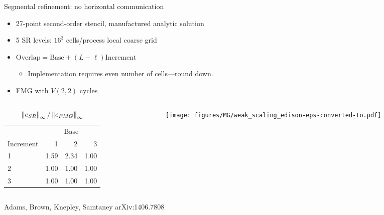 \documentclass{beamer}
\begin{document}

\begin{frame}{Segmental refinement: no horizontal communication}
  \begin{itemize}
  \item 27-point second-order stencil, manufactured analytic solution
  \item 5 SR levels: $16^3$ cells/process local coarse grid
  \item $\text{Overlap} = \text{Base} + (L-\ell) \text{Increment}$
    \begin{itemize}
    \item Implementation requires even number of cells---round down.
    \end{itemize}
  \item FMG with $V(2,2)$ cycles
  \end{itemize}
  \begin{columns}
    \begin{column}{0.4\textwidth}
      \begin{table}\small
        \centering\caption{$\left\lVert e_{SR} \right\rVert_\infty / \left\lVert e_{FMG} \right\rVert_\infty$}\label{tab:sr-error}
        \begin{tabular}{l rrr}
          \toprule
          & \multicolumn{3}{c}{Base} \\
          Increment & 1 & 2 & 3 \\
          \midrule
          1 & {\color{red} 1.59} & {\color{red} 2.34} & 1.00 \\
          2 & 1.00 & 1.00 & 1.00 \\
          3 & 1.00 & 1.00 & 1.00 \\
          \bottomrule
        \end{tabular}
      \end{table}
    \end{column}
    \begin{column}{0.6\textwidth}
      \texttt{[image: figures/MG/weak\_scaling\_edison-eps-converted-to.pdf]}
    \end{column}
  \end{columns}
  {\scriptsize Adams, Brown, Knepley, Samtaney arXiv:1406.7808}
\end{frame}

\end{document}
